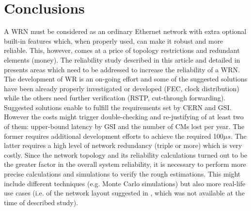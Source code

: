 \section{Conclusions}


A WRN must be considered as an ordinary Ethernet network with extra optional built-in features 
which, when properly used, can make it robust and more reliable. This, however, comes at a price 
of topology restrictions and redundant elements (money). The reliability study described in this 
article and detailed in \cite{biblio:robustness} presents areas which need to be addressed to 
increase the reliability of a WRN. The development of WR is an on-going effort and some of the 
suggested solutions have been already properly investigated or developed (FEC, clock distribution) 
while the others need further verification (RSTP, cut-through forwarding). 
Suggested solutions enable to fulfill the requirements set by CERN and GSI. 
However the costs might trigger double-checking and re-justifying of at least two of them: 
upper-bound latency by GSI and the number of CMs lost per year.
The former requires additional development efforts to achieve the required 100$\mu s$. 
The latter requires a high level of network redundancy (triple or more) which is very costly. 
Since the network topology and its reliability calculations turned out to be the greater factor in 
the overall system reliability, it is necessary to perform more precise calculations and 
simulations to verify the rough estimations. This might include different techniques (e.g. Monte Carlo simulations) 
but also more real-life use cases (i.e. of the network layout suggested in 
\cite{biblio:CERNwrControlAndTiming}, which was not available at the time of described study). 
